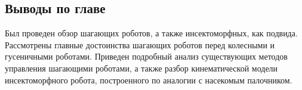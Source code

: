 \subsection{Выводы по главе}

Был проведен обзор шагающих роботов, а также инсектоморфных, как подвида. Рассмотрены главные достоинства шагающих роботов перед колесными и гусеничными роботами. Приведен подробный анализ существующих методов управления шагающими роботами, а также разбор кинематической модели инсектоморфного робота, построенного по аналогии с насекомым палочником.